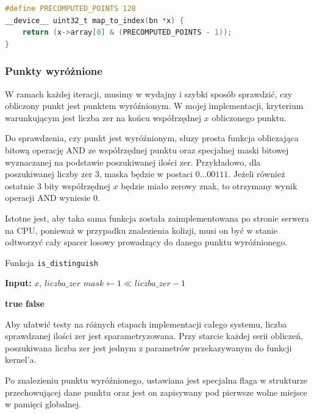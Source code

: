 \begin{lstlisting}[language=C, caption=Funkcja przydzielająca punkt]
#define PRECOMPUTED_POINTS 128
__device__ uint32_t map_to_index(bn *x) {
    return (x->array[0] & (PRECOMPUTED_POINTS - 1));
}
\end{lstlisting}


\subsubsection{Punkty wyróżnione}
W ramach każdej iteracji, musimy w wydajny i szybki sposób sprawdzić, czy obliczony punkt jest punktem wyróźnionym.
W mojej implementacji, kryterium warunkującym jest liczba zer na końcu współrzędnej $x$ obliczonego punktu.
\par
Do sprawdzenia, czy punkt jest wyróźnionym, słuzy prosta funkcja obliczająca bitową operację AND ze
współrzędnej punktu oraz specjalnej maski bitowej wyznaczanej na podstawie poszukiwanej ilości zer.
Przykładowo, dla poszukiwanej liczby zer 3, maska będzie w postaci $0 ... 00111$. Jeżeli
również ostatnie 3 bity współrzędnej $x$ będzie miało zerowy znak, to otrzymany wynik operacji AND wyniesie 0.
\par
Istotne jest, aby taka sama funkcja została zaimplementowana po stronie serwera na CPU, ponieważ w przypadku znalezienia kolizji,
musi on być w stanie odtworzyć cały spacer losowy prowadzący do danego punktu wyróźnionego.

\begin{algorithm}
    \caption{Funkcja \texttt{is\_distinguish}}
    \begin{algorithmic}[1]
        \State \textbf{Input:} $x$, $liczba\_zer$
        \State $mask \gets 1 \ll liczba\_zer - 1$

        \State \Return \textbf{true}
        \Else
        \State \Return \textbf{false}
        \EndIf
    \end{algorithmic}
\end{algorithm}

\par
Aby ułatwić testy na różnych etapach implementacji całego systemu,
liczba sprawdzanej ilości zer jest sparametryzowana. Przy starcie każdej serii obliczeń, poszukiwana liczba zer jest jednym z parametrów przekazywanym
do funkcji kernel'a.
\par
Po znalezieniu punktu wyróźnionego, ustawiana jest specjalna flaga w strukturze przechowującej dane punktu oraz
jest on zapisywany pod pierwsze wolne miejsce w pamięci globalnej.


